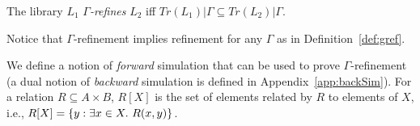 
\vspace{-1.5mm}
\begin{definition}\label{def:gref}
The library $L_1$ \emph{$\Gamma$-refines} $L_2$ if{f} $Tr(L_1) | \Gamma \subseteq Tr(L_2) | \Gamma$.
\vspace{-1.5mm}
\end{definition}

Notice that $\Gamma$-refinement implies refinement for any $\Gamma$ as in Definition~\ref{def:gref}.

We define a notion of \emph{forward} simulation that can be used to prove $\Gamma$-refinement (a dual notion of \emph{backward} simulation is defined in 
Appendix~\ref{app:backSim}). 
For a relation $R\subseteq A\times B$, $R[X]$ is the set of elements related by $R$ to elements of $X$, i.e., $R[X]=\set{y:\exists x\in X.\ R(x,y)}$.

